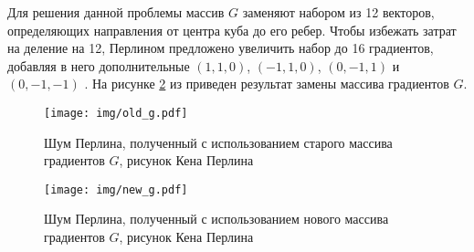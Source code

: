 Для решения данной проблемы массив $G$ заменяют набором из 12 векторов, определяющих направления от центра куба до его ребер. Чтобы избежать затрат на деление на 12, Перлином предложено увеличить набор до 16 градиентов, добавляя в него дополнительные $(1,1,0)$, $(-1,1,0)$, $(0,-1,1)$ и $(0,-1,-1)$ \cite{impperlin}. На рисунке \ref{fig:new_g} из \cite{impperlin} приведен результат замены массива градиентов $G$.

\clearpage
\begin{figure}[h]
	\centering
	\texttt{[image: img/old\_g.pdf]}
	\caption{Шум Перлина, полученный с использованием старого массива градиентов $G$, рисунок Кена Перлина \cite{impperlin}}
	\label{fig:old_g}
\end{figure}

\begin{figure}[h]
	\centering
	\texttt{[image: img/new\_g.pdf]}
	\caption{Шум Перлина, полученный с использованием нового массива градиентов $G$, рисунок Кена Перлина \cite{impperlin}}
	\label{fig:new_g}
\end{figure}












